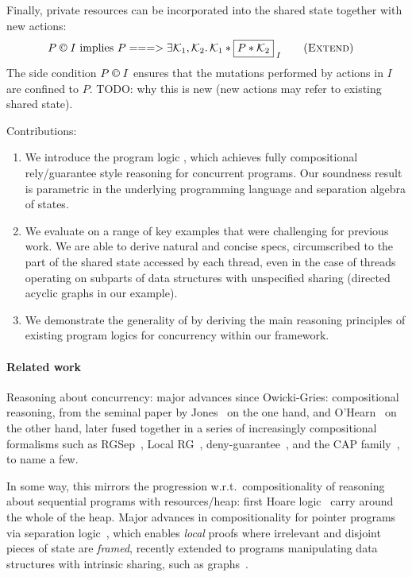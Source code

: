 Finally, private resources can be incorporated into the shared state
together with new actions:
\begin{align}
  P \containI I
  &\text{ implies }
  P ===>
  \exsts{\capAss{1}, \capAss{2}} \capAss{1} * \shared{P *
    \capAss{2}}{I}
  \tag{\textsc{Extend}}
\end{align}
The side condition $P \containI I$ ensures that the mutations
performed by actions in $I$ are confined to $P$.  TODO: why this is
new (new actions may refer to existing shared state).



Contributions:
\begin{enumerate}
\item
  We introduce the program logic \colosl, which achieves fully
  compositional rely/guarantee style reasoning for concurrent
  programs. Our soundness result is parametric in the underlying
  programming language and separation algebra of states.
\item
  We evaluate \colosl on a range of key examples that were challenging
  for previous work. We are able to derive natural and concise specs,
  circumscribed to the part of the shared state accessed by each
  thread, even in the case of threads operating on subparts of data
  structures with unspecified sharing (directed acyclic graphs in our
  example).
\item
  We demonstrate the generality of \colosl by deriving the main
  reasoning principles of existing program logics for concurrency
  within our framework.
\end{enumerate}

\paragraph{Related work}
Reasoning about concurrency: major advances since Owicki-Gries:
compositional reasoning, from the seminal paper by Jones~\cite{rg} on
the one hand, and O'Hearn~\cite{csl-orig,csl-tcs} on the other hand,
later fused together in a series of increasingly compositional
formalisms such as RGSep~\cite{viktor-marriage}, Local RG~\cite{lrg},
deny-guarantee~\cite{dg}, and the CAP
family~\cite{cap-ecoop10,icap,tada}, to name a few.


In some way, this mirrors the progression w.r.t.\ compositionality of
reasoning about sequential programs with resources/heap: first Hoare
logic~\cite{hoarelogic} carry around the whole of the heap. Major
advances in compositionality for pointer programs via separation
logic~\cite{seplog}, which enables \emph{local} proofs where
irrelevant and disjoint pieces of state are \emph{framed}, recently
extended to programs manipulating data structures with intrinsic
sharing, such as graphs~\cite{ramification}.


